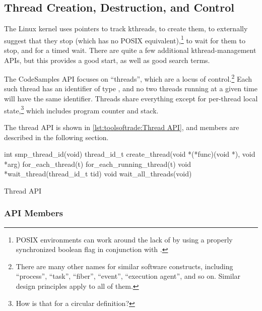 \subsection{Thread Creation, Destruction, and Control}
\label{sec:toolsoftrade:Thread Creation; Destruction; and Control}

The Linux kernel uses
 pointers to track kthreads,
 to create them,
 to externally suggest that they stop
(which has no POSIX equivalent),\footnote{
	POSIX environments can work around the lack of
	 by using a properly synchronized
	boolean flag in conjunction with .}
 to wait for them to stop, and
 for a timed wait.
There are quite a few additional kthread-management APIs, but this
provides a good start, as well as good search terms.

The CodeSamples API focuses on ``threads'', which are a locus of
control.\footnote{
	There are many other names for similar software constructs, including
	``process'', ``task'', ``fiber'', ``event'', ``execution agent'',
	and so on.
	Similar design principles apply to all of them.}
Each such thread has an identifier of type ,
and no two threads running at a given time will have the same
identifier.
Threads share everything except for per-thread local state,\footnote{
	How is that for a circular definition?}
which includes program counter and stack.

The thread API is shown in
\cref{lst:toolsoftrade:Thread API}, and members are described in the
following section.

\begin{listing}
\begin{VerbatimL}[numbers=none,xleftmargin=2pt]
int smp_thread_id(void)
thread_id_t create_thread(void *(*func)(void *), void *arg)
for_each_thread(t)
for_each_running_thread(t)
void *wait_thread(thread_id_t tid)
void wait_all_threads(void)
\end{VerbatimL}
\caption{Thread API}
\label{lst:toolsoftrade:Thread API}
\end{listing}

\subsubsection{API Members}

